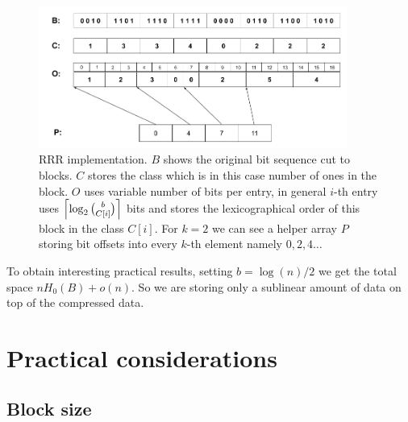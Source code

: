 \begin{figure}
	\centerline{
		\includegraphics[width=0.9\textwidth, height=0.3\textheight]{images/rrr}
	}
	\caption[TODO]{RRR implementation. $B$ shows the original bit sequence cut to
    blocks. $C$ stores the class which is in this case number of ones in the block.
    $O$ uses variable number of bits per entry, in general $i$-th entry uses
    $\left\lceil \log_2{b\choose C[i]} \right\rceil$ bits and stores the lexicographical order
    of this block in the class $C[i]$. For $k=2$ we can see a helper array $P$
    storing bit offsets into every $k$-th element namely $0, 2, 4\ldots$
	}
	\label{obr:RRRFinal}
\end{figure}

To obtain interesting practical results, setting $b=\log(n)/2$ we get the total space
$nH_0(B) + o(n)$. So we are storing only a sublinear amount of data on top of the compressed
data.

\section{Practical considerations}

\subsection{Block size}

